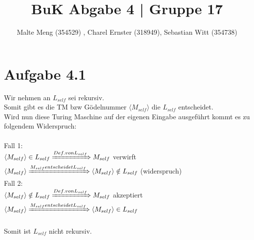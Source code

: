 \documentclass{article}
\title{BuK Abgabe 4 | Gruppe 17}
\author{Malte Meng (354529) , Charel Ernster (318949), Sebastian Witt (354738)}
\begin{document}
	\maketitle 
	\section[a 4.1]{Aufgabe 4.1}
		Wir nehmen an $L_{self}$ sei rekursiv.\\
		Somit gibt es die TM bzw Gödelnummer $\langle M_{self}\rangle$ die $L_{self}$ entscheidet.\\
		Wird nun diese Turing Maschine auf der eigenen Eingabe ausgeführt kommt es zu folgendem Widerspruch:\\\\
		Fall 1:\\
		$\langle M_{self}\rangle \in L_{self} \xRightarrow{Def. von L_{self}} M_{self}$ verwirft $\langle M_{self}\rangle \\
		\xRightarrow{M_{self} entscheidet L_{self}} \langle M_{self}\rangle \notin L_{self}$ (widerspruch)\\
		Fall 2:\\
		$\langle M_{self}\rangle \notin L_{self} \xRightarrow{Def. von L_{self}} M_{self}$ akzeptiert $\langle M_{self}\rangle\\ \xRightarrow{M_{self} entscheidet L_{self}} \langle M_{self}\rangle \in L_{self}$\\\\
		Somit ist $L_{self}$ nicht rekursiv.\\
\end{document}
